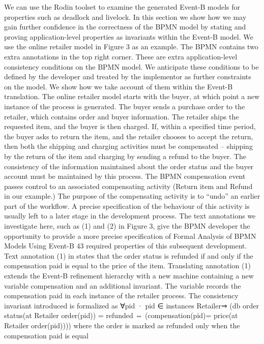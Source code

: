 We can use the Rodin toolset to examine the generated Event-B models for
properties such as deadlock and livelock. In this section we show how we may gain
further confidence in the correctness of the BPMN model by stating and proving
application-level properties as invariants within the Event-B model. We use the
online retailer model in Figure 3 as an example. The BPMN contains two extra
annotations in the top right corner. These are extra application-level consistency
conditions on the BPMN model. We anticipate these conditions to be defined
by the developer and treated by the implementor as further constraints on the
model. We show how we take account of them within the Event-B translation.
The online retailer model starts with the buyer, at which point a new instance
of the process is generated. The buyer sends a purchase order to the retailer,
which contains order and buyer information. The retailer ships the requested
item, and the buyer is then charged. If, within a specified time period, the
buyer asks to return the item, and the retailer chooses to accept the return,
then both the shipping and charging activities must be compensated – shipping
by the return of the item and charging by sending a refund to the buyer. The
consistency of the information maintained about the order status and the buyer
account must be maintained by this process.
The BPMN compensation event passes control to an associated compensating
activity (Return item and Refund in our example.) The purpose of the compensating activity is to “undo” an earlier part of the workflow. A precise specification
of the behaviour of this activity is usually left to a later stage in the development
process.
The text annotations we investigate here, such as (1) and (2) in Figure 3, give
the BPMN developer the opportunity to provide a more precise specification of
Formal Analysis of BPMN Models Using Event-B 43
required properties of this subsequent development. Text annotation (1) in states
that the order status is refunded if and only if the compensation paid is equal to
the price of the item. Translating annotation (1) extends the Event-B refinement
hierarchy with a new machine containing a new variable compensation and an
additional invariant. The variable records the compensation paid in each instance
of the retailer process. The consistency invariant introduced is formalized as
∀pid · pid ∈ instances Retailer⇒
(db order status(at Retailer order(pid)) = refunded ⇔
(compensation(pid)= price(at Retailer order(pid))))
where the order is marked as refunded only when the compensation paid is equal
